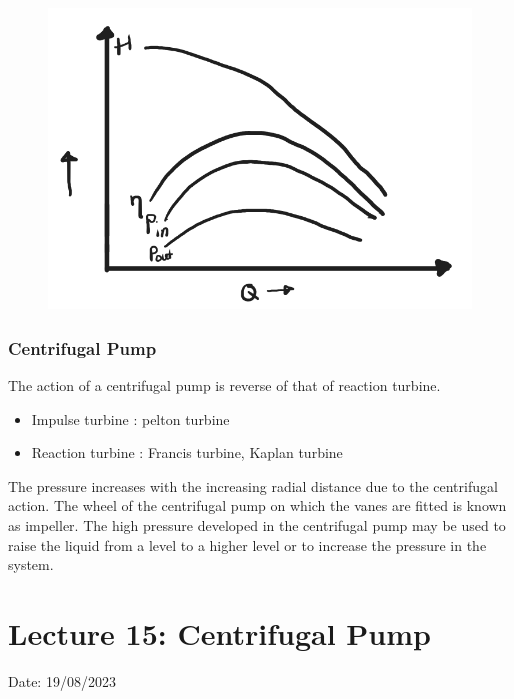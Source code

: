 \documentclass{article}
\begin{document}
\begin{multicols}{2}
\begin{figure}[H]
  \begin{center}
    \includegraphics[width=\columnwidth]{img/operating_curve.png}
  \end{center}
\end{figure}

\subsubsection*{Centrifugal Pump}
The action of a centrifugal pump is reverse of that of reaction turbine. 
\begin{itemize}
  \item Impulse turbine :  pelton turbine 
  \item Reaction turbine : Francis turbine, Kaplan turbine 
\end{itemize}

The pressure increases with the increasing radial distance due to the centrifugal action. The wheel of the centrifugal pump on which the vanes are fitted is known as impeller. The high pressure developed in the centrifugal pump may be used to raise the liquid from a level to a higher level or to increase the pressure in the system.
\end{multicols}

\vspace*{1cm}

\section{Lecture 15: Centrifugal Pump}
\hfill Date: 19/08/2023
\end{document}
